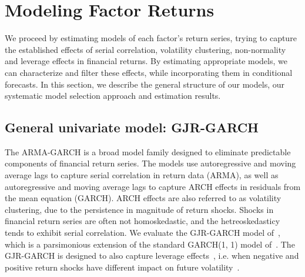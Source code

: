 
\section{Modeling Factor Returns} %
\label{sec:modeling_factor_returns}

We proceed by estimating models of each factor's return series, trying to capture the established effects of serial correlation, volatility clustering, non-normality and leverage effects in financial returns. By estimating appropriate models, we can characterize and filter these effects, while incorporating them in conditional forecasts. In this section, we describe the general structure of our models, our systematic model selection approach and estimation results.

\subsection{General univariate model: GJR-GARCH} %
\label{sub:general_univariate_model_gjr_garch}

The ARMA-GARCH is a broad model family designed to eliminate predictable components of financial return series. The models use autoregressive and moving average lags to capture serial correlation in return data (ARMA), as well as autoregressive and moving average lags to capture ARCH effects in residuals from the mean equation (GARCH). ARCH effects are also referred to as volatility clustering, due to the persistence in magnitude of return shocks. Shocks in financial return series are often not homoskedastic, and the hetreoskedasticy tends to exhibit serial correlation. We evaluate the GJR-GARCH model of~\textcite{glosten1993relation}, which is a parsimonious extension of the standard GARCH(1, 1) model of~\autocite{Bollerslev1986}. The GJR-GARCH is designed to also capture leverage effects~\autocite{glosten1993relation}, i.e. when negative and positive return shocks have different impact on future volatility~\autocite{Black1976}.

